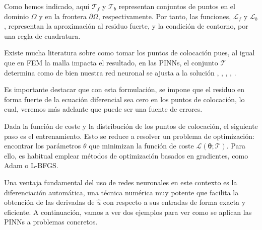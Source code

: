 \documentclass[a4paper,11pt,spanish, twoside, leqno]{tfg-uam}
\theoremstyle{definition}
\begin{document}
Como hemos indicado, aquí $\mathcal{T}_f$ y $\mathcal{T}_b$ representan conjuntos de puntos en el dominio $\Omega$ y en la frontera $\partial\Omega$, respectivamente. Por tanto, las funciones, $\mathcal{L}_f$ y $\mathcal{L}_b$, representan la aproximación al residuo fuerte, y la condición de contorno, por una regla de cuadratura. 


Existe mucha literatura sobre como tomar los puntos de colocación pues, al igual que en FEM la malla impacta el resultado, en las PINNs, el conjunto $\mathcal{T}$ determina como de bien nuestra red neuronal se ajusta a la solución \cite{münzer2022curriculumtrainingbasedstrategydistributingcollocation}, \cite{aikawa2024improving}, \cite{matsubara2023goodlatticetrainingphysicsinformed}, \cite{subramanian2022adaptiveselfsupervisionalgorithmsphysicsinformed}, \cite{hou2023enhancing}.  

Es importante destacar que con esta formulación, se impone que el residuo en forma fuerte de la ecuación diferencial sea cero en los puntos de colocación, lo cual, veremos más adelante que puede ser una fuente de errores. 

Dada la función de coste y la distribución de los puntos de colocación, el siguiente paso es el entrenamiento. Esto se reduce a resolver un problema de optimización: encontrar los parámetros $\theta$ que minimizan la función de coste $\mathcal{L}(\boldsymbol{\theta}; \mathcal{T})$. Para ello, es habitual emplear métodos de optimización basados en gradientes, como Adam o L-BFGS. 

Una ventaja fundamental del uso de redes neuronales en este contexto es la diferenciación automática, una técnica numérica muy potente que facilita la obtención de las derivadas de $\hat{u}$ con respecto a sus entradas de forma exacta y eficiente.
A continuación, vamos a ver dos ejemplos para ver como se aplican las PINNs a problemas concretos.
\end{document}
